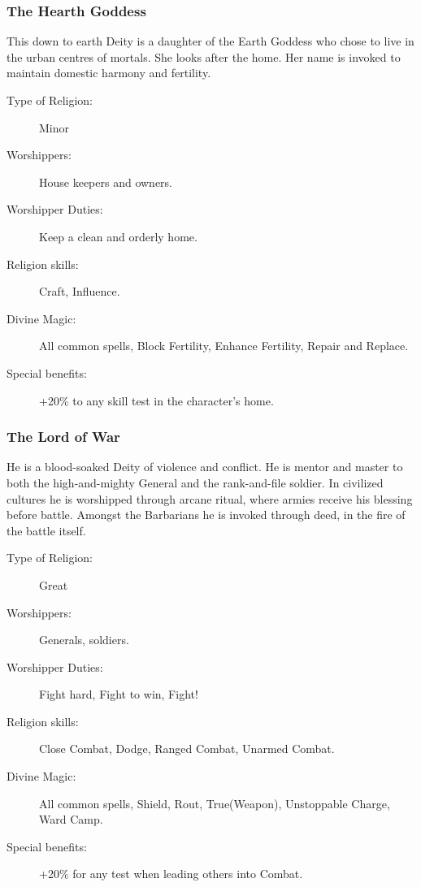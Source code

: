 \subsubsection{The Hearth Goddess}
This down to earth Deity is a daughter of the Earth Goddess who chose to live in the urban centres of mortals. She looks after the home. Her name is invoked to maintain domestic harmony and fertility.

\begin{description}
\item[Type of Religion:] Minor
\item[Worshippers:] House keepers and owners.
\item[Worshipper Duties:] Keep a clean and orderly home.
\item[Religion skills:] Craft, Influence.
\item[Divine Magic:] All common spells, Block Fertility, Enhance Fertility, Repair and Replace.
\item[Special benefits:] +20\% to any skill test in the character’s home.
\end{description}


\subsubsection{The Lord of War}
He is a blood-soaked Deity of violence and conflict. He is mentor and master to both the high-and-mighty General and the rank-and-file soldier. In civilized cultures he is worshipped through arcane ritual, where armies receive his blessing before battle. Amongst the Barbarians he is invoked through deed, in the fire of the battle itself.

\begin{description}
\item[Type of Religion:] Great
\item[Worshippers:] Generals, soldiers.
\item[Worshipper Duties:] Fight hard, Fight to win, Fight!
\item[Religion skills:] Close Combat, Dodge, Ranged Combat, Unarmed Combat.
\item[Divine Magic:] All common spells, Shield, Rout, True(Weapon), Unstoppable Charge, Ward Camp.
\item[Special benefits:] +20\% for any test when leading others into Combat.
\end{description}


